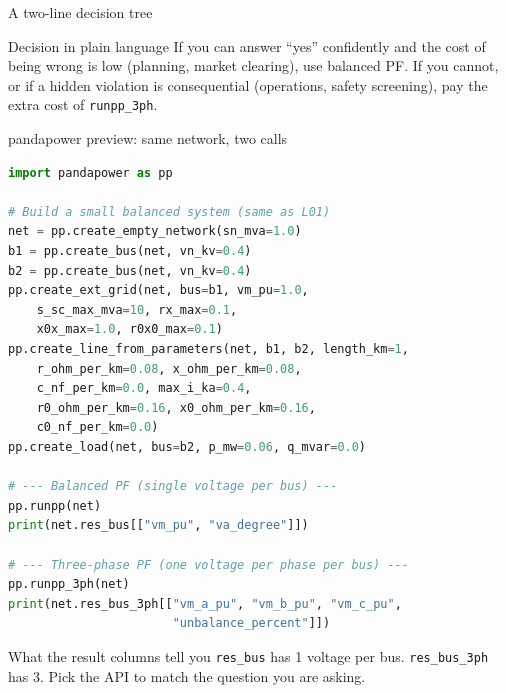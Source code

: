\documentclass[aspectratio=169,10pt]{beamer}
\newcommand{\code}[1]{\texttt{#1}}
\begin{document}
\begin{frame}{A two-line decision tree}
\centering
{}
\vspace{0.6em}
\begin{block}{Decision in plain language}
If you can answer ``yes'' confidently and the cost of being wrong is low (planning, market clearing), use balanced PF. If you cannot, or if a hidden violation is consequential (operations, safety screening), pay the extra cost of \code{runpp\_3ph}.
\end{block}
\end{frame}

\begin{frame}[fragile,shrink=12]{pandapower preview: same network, two calls}
\begin{lstlisting}[language=Python]
import pandapower as pp

# Build a small balanced system (same as L01)
net = pp.create_empty_network(sn_mva=1.0)
b1 = pp.create_bus(net, vn_kv=0.4)
b2 = pp.create_bus(net, vn_kv=0.4)
pp.create_ext_grid(net, bus=b1, vm_pu=1.0,
    s_sc_max_mva=10, rx_max=0.1,
    x0x_max=1.0, r0x0_max=0.1)
pp.create_line_from_parameters(net, b1, b2, length_km=1,
    r_ohm_per_km=0.08, x_ohm_per_km=0.08,
    c_nf_per_km=0.0, max_i_ka=0.4,
    r0_ohm_per_km=0.16, x0_ohm_per_km=0.16,
    c0_nf_per_km=0.0)
pp.create_load(net, bus=b2, p_mw=0.06, q_mvar=0.0)

# --- Balanced PF (single voltage per bus) ---
pp.runpp(net)
print(net.res_bus[["vm_pu", "va_degree"]])

# --- Three-phase PF (one voltage per phase per bus) ---
pp.runpp_3ph(net)
print(net.res_bus_3ph[["vm_a_pu", "vm_b_pu", "vm_c_pu",
                       "unbalance_percent"]])
\end{lstlisting}
\begin{alertblock}{What the result columns tell you}
\code{res\_bus} has 1 voltage per bus. \code{res\_bus\_3ph} has 3. Pick the API to match the question you are asking.
\end{alertblock}
\end{frame}
\end{document}
